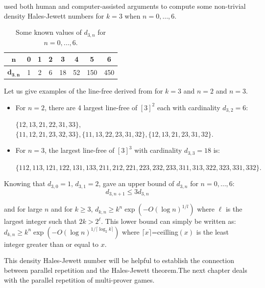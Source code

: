 \cite{polymath2010density} used both human and computer-assisted arguments to compute some non-trivial density Hales-Jewett numbers for $k=3$ when $n= 0,\ldots,6.$

\begin{table}[h]
\centering
\begin{tabular}{|c|c|c|c|c|c|c|c|}
\hline 
$\mathbf{n}$ & 0 & 1 & 2 & 3 & 4 & 5 & 6 \\ 
\hline 
$\mathbf{d_{3,n}}$ & 1 & 2 & 6 & 18 & 52 & 150 & 450 \\ 
\hline 
\end{tabular}
\caption{Some known values of $d_{3,n}$ for $ n= 0,\ldots,6.$}
\end{table} 

Let us give examples of the line-free derived from \cite{polymath2010density} for $k=3$ and $n=2$ and $n=3.$
\begin{itemize}
\item For $n=2$, there are 4 largest line-free of $[3]^2$ each with cardinality $d_{3,2}=6 :$ 

$ \{12, 13, 21, 22, 31, 33 \}$, $\{11, 12, 21, 23, 32, 33 \}, \{11, 13, 22, 23, 31, 32 \}, \{12, 13, 21, 23, 31, 32 \}.$
\item For $n=3$, the largest line-free of $[3]^3$ with cardinality $d_{3,3}=18$ is: 

$\{112, 113, 121, 122, 131, 133, 211, 212, 221, 223, 232, 233, 311, 313, 322, 323, 331, 332 \}.$
\end{itemize}

Knowing that $d_{3,0}=1$, $d_{3,1}=2$,  \cite{polymath2010density} gave an upper bound of $d_{3,n}$ for $n= 0,\ldots,6$: $$d_{3,n+1} \leq 3 d_{3,n}$$

and for large $n$ and for $k\geq 3$, $d_{k,n} \geq k^n \exp \left(-O(\log n)^{1/l}\right)$ where $\ell$ is the largest integer such that $2k > 2^{\ell}$. This lower bound can simply be written as: $d_{k,n} \geq k^n  \exp \left(-O(\log n)^{1/\lceil \log_2 k \rceil}\right)$ where $\lceil x \rceil$=ceilling$(x)$ is the least integer greater than or equal to $x.$ 

This density Hales-Jewett number will be helpful to establish the connection between parallel repetition and the Hales-Jewett theorem.The next chapter deals with the parallel repetition of multi-prover games.
%

%
% 
 
